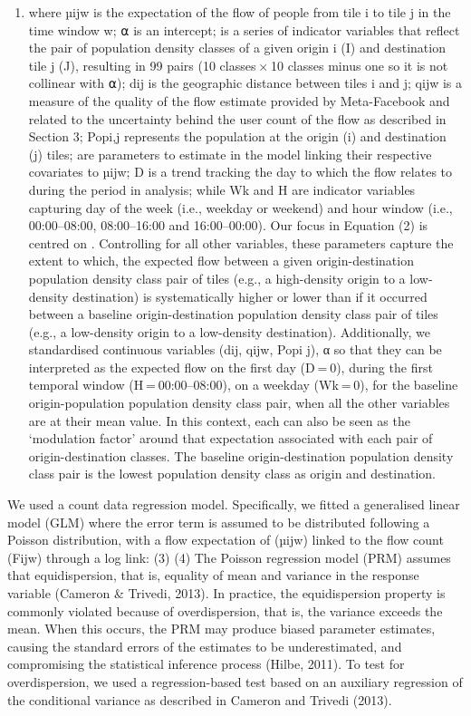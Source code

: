 \documentclass[11pt,letterpaper]{article}
\providecommand{\tightlist}{%
  \setlength{\itemsep}{0pt}\setlength{\parskip}{0pt}}
\begin{document}
\begin{enumerate}
\def\labelenumi{(\arabic{enumi})}
\setcounter{enumi}{1}
\tightlist
\item
  where µijw is the expectation of the flow of people from tile i to
  tile j in the time window w; ⍺ is an intercept; is a series of
  indicator variables that reflect the pair of population density
  classes of a given origin i (I) and destination tile j (J), resulting
  in 99 pairs (10 classes × 10 classes minus one so it is not collinear
  with ⍺); dij is the geographic distance between tiles i and j; qijw is
  a measure of the quality of the flow estimate provided by
  Meta-Facebook and related to the uncertainty behind the user count of
  the flow as described in Section 3; Popi,j represents the population
  at the origin (i) and destination (j) tiles; are parameters to
  estimate in the model linking their respective covariates to µijw; D
  is a trend tracking the day to which the flow relates to during the
  period in analysis; while Wk and H are indicator variables capturing
  day of the week (i.e., weekday or weekend) and hour window (i.e.,
  00:00--08:00, 08:00--16:00 and 16:00--00:00). Our focus in Equation
  (2) is centred on . Controlling for all other variables, these
  parameters capture the extent to which, the expected flow between a
  given origin-destination population density class pair of tiles (e.g.,
  a high-density origin to a low-density destination) is systematically
  higher or lower than if it occurred between a baseline
  origin-destination population density class pair of tiles (e.g., a
  low-density origin to a low-density destination). Additionally, we
  standardised continuous variables (dij, qijw, Popi j), α so that they
  can be interpreted as the expected flow on the first day (D = 0),
  during the first temporal window (H = 00:00--08:00), on a weekday
  (Wk = 0), for the baseline origin-population population density class
  pair, when all the other variables are at their mean value. In this
  context, each can also be seen as the `modulation factor' around that
  expectation associated with each pair of origin-destination classes.
  The baseline origin-destination population density class pair is the
  lowest population density class as origin and destination.
\end{enumerate}

We used a count data regression model. Specifically, we fitted a
generalised linear model (GLM) where the error term is assumed to be
distributed following a Poisson distribution, with a flow expectation of
(µijw) linked to the flow count (Fijw) through a log link: (3) (4) The
Poisson regression model (PRM) assumes that equidispersion, that is,
equality of mean and variance in the response variable (Cameron \&
Trivedi, 2013). In practice, the equidispersion property is commonly
violated because of overdispersion, that is, the variance exceeds the
mean. When this occurs, the PRM may produce biased parameter estimates,
causing the standard errors of the estimates to be underestimated, and
compromising the statistical inference process (Hilbe, 2011). To test
for overdispersion, we used a regression-based test based on an
auxiliary regression of the conditional variance as described in Cameron
and Trivedi (2013).
\end{document}
